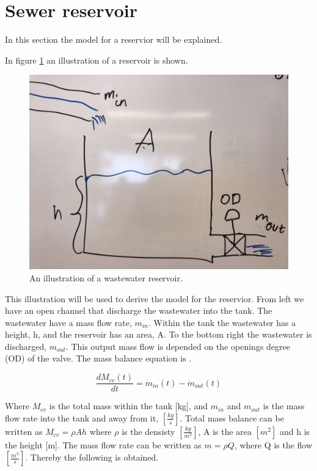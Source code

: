 \section{Sewer reservoir}\label{se:sewer_reservoir}
In this section the model for a reservior will be explained. 

In figure \ref{fig:tank_model} an illustration of a reservoir is shown.
\begin{figure}[H]
\centering
\includegraphics[width=.6\textwidth]{report/modeling/pictures/tank_model.jpg}
\caption{An illustration of a wastewater reservoir.}
\label{fig:tank_model}
\end{figure} 

This illustration will be used to derive the model for the reservior. From left we have an open channel that discharge the wastewater into the tank. The wastewater have a mass flow rate, $m_{in}$. Within the tank the wastewater has a height, h, and the reservoir has an area, A. To the bottom right the wastewater is discharged, $m_{out}$. This output mass flow is depended on the openings degree (OD) of the valve. The mass balance equation is \cite{model_tank}.


\begin{equation}
	 	\frac{dM_{cv}(t)}{dt}=\dot{m}_{in}(t)-\dot{m}_{out}(t)
\end{equation} 

Where $M_{cv}$ is the total mass within the tank [kg], and $m_{in}$ and $m_{out}$ is the mass flow rate into the tank and away from it, $\left[\frac{kg}{s}\right]$. Total mass balance can be written as $M_{cv} = \rho Ah$ where $\rho$ is the densisty $\left[\frac{kg}{m^3}\right]$, A is the area $\left[m^2\right]$ and h is the height [m]. The mass flow rate can be written as $m = \rho Q$, where Q is the flow $\left[\frac{m^3}{s}\right]$. Thereby the following is obtained.

